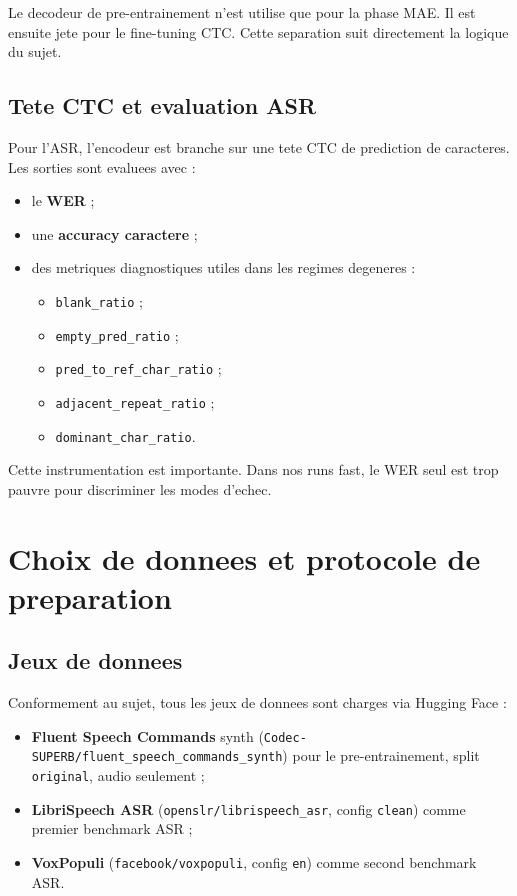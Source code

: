 \documentclass[11pt,a4paper]{article}
\begin{document}
Le decodeur de pre-entrainement n'est utilise que pour la phase MAE. Il est ensuite jete pour le fine-tuning CTC. Cette separation suit directement la logique du sujet.

\subsection{Tete CTC et evaluation ASR}
Pour l'ASR, l'encodeur est branche sur une tete CTC de prediction de caracteres. Les sorties sont evaluees avec :
\begin{itemize}[leftmargin=1.2cm]
\item le \textbf{WER} ;
\item une \textbf{accuracy caractere} ;
\item des metriques diagnostiques utiles dans les regimes degeneres :
  \begin{itemize}
  \item \texttt{blank\_ratio} ;
  \item \texttt{empty\_pred\_ratio} ;
  \item \texttt{pred\_to\_ref\_char\_ratio} ;
  \item \texttt{adjacent\_repeat\_ratio} ;
  \item \texttt{dominant\_char\_ratio}.
  \end{itemize}
\end{itemize}

Cette instrumentation est importante. Dans nos runs fast, le WER seul est trop pauvre pour discriminer les modes d'echec.

\section{Choix de donnees et protocole de preparation}
\subsection{Jeux de donnees}
Conformement au sujet, tous les jeux de donnees sont charges via Hugging Face :
\begin{itemize}[leftmargin=1.2cm]
\item \textbf{Fluent Speech Commands} synth (\texttt{Codec-SUPERB/fluent\_speech\_commands\_synth}) pour le pre-entrainement, split \texttt{original}, audio seulement ;
\item \textbf{LibriSpeech ASR} (\texttt{openslr/librispeech\_asr}, config \texttt{clean}) comme premier benchmark ASR ;
\item \textbf{VoxPopuli} (\texttt{facebook/voxpopuli}, config \texttt{en}) comme second benchmark ASR.
\end{itemize}
\end{document}
